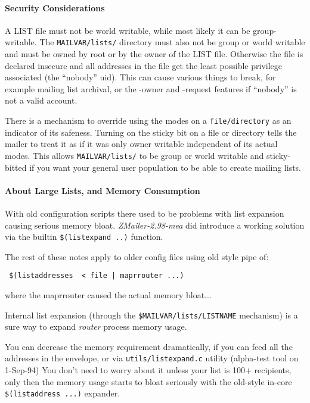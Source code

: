 \paragraph{Security Considerations}



A LIST file must not be world writable, while most likely it can be
group-writable.  The {\tt MAILVAR/lists/} directory must also not be group
or world writable and must be owned by root or by the owner of the
LIST file.  Otherwise the file is declared insecure and all addresses
in the file get the least possible privilege associated (the ``nobody''
uid).  This can cause various things to break, for example mailing
list archival, or the -owner and -request features if ``nobody'' is
not a valid account.

There is a mechanism to override using the modes on a {\tt file/directory}
as an indicator of its safeness.  Turning on the sticky bit on a file
or directory tells the mailer to treat it as if it was only owner
writable independent of its actual modes.  This allows {\tt MAILVAR/lists/}
to be group or world writable and sticky-bitted if you want your general
user population to be able to create mailing lists.




\paragraph{About Large Lists, and Memory Consumption}



With old configuration scripts there used to be problems with list
expansion causing serious memory bloat.  {\em ZMailer-2.98-mea\/} did introduce
a working solution via the builtin  {\tt \$(listexpand ..)} function.

The rest of these notes apply to older config files using old style pipe
of:
\begin{verbatim}
 $(listaddresses  < file | maprrouter ...)
\end{verbatim}
where the maprrouter caused the actual memory bloat...

Internal list expansion (through the  {\tt \$MAILVAR/lists/LISTNAME} 
mechanism) is a sure way to expand {\em router\/} process memory usage.

You can decrease the memory requirement dramatically, if you can
feed all the addresses in the envelope, or via {\tt utils/listexpand.c}
utility (alpha-test tool on 1-Sep-94) You don't need to worry about 
it unless your list is 100+ recipients, only then the memory usage starts 
to bloat seriously with the old-style in-core {\tt \$(listaddress ...)} 
expander.


